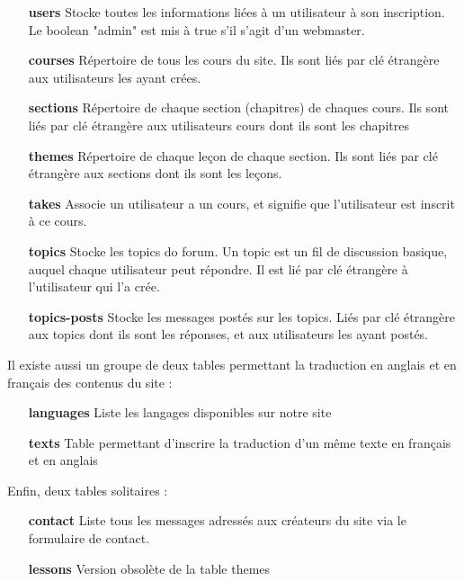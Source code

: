\documentclass[a4paper,11pt]{article}
\begin{document}
\begin{itemize}
\item[\textbf{users}] Stocke toutes les informations liées à un utilisateur à son inscription. Le boolean "admin" est mis à true s'il s'agit d'un webmaster.
\item[\textbf{courses}] Répertoire de tous les cours du site. Ils sont liés par clé étrangère aux utilisateurs les ayant crées.
\item[\textbf{sections}] Répertoire de chaque section (chapitres) de chaques cours. Ils sont liés par clé étrangère aux utilisateurs cours dont ils sont les chapitres
\item[\textbf{themes}] Répertoire de chaque leçon de chaque section. Ils sont liés par clé étrangère aux sections dont ils sont les leçons.
\item[\textbf{takes}] Associe un utilisateur a un cours, et signifie que l'utilisateur est inscrit à ce cours.
\item[\textbf{topics}] Stocke les topics do forum. Un topic est un fil de discussion basique, auquel chaque utilisateur peut répondre. Il est lié par clé étrangère à l'utilisateur qui l'a crée.
\item[\textbf{topics-posts}] Stocke les messages postés sur les topics. Liés par clé étrangère aux topics dont ils sont les réponses, et aux utilisateurs les ayant postés.
\end{itemize}

Il existe aussi un groupe de deux tables permettant la traduction en anglais et en français des contenus du site : 

\begin{itemize}
\item[\textbf{languages}] Liste les langages disponibles sur notre site
\item[\textbf{texts}] Table permettant d'inscrire la traduction d'un même texte en français et en anglais
\end{itemize}

Enfin, deux tables solitaires :

\begin{itemize}
\item[\textbf{contact}] Liste tous les messages adressés aux créateurs du site via le formulaire de contact.
\item[\textbf{lessons}] Version obsolète de la table themes
\end{itemize}
\newpage
\end{document}

